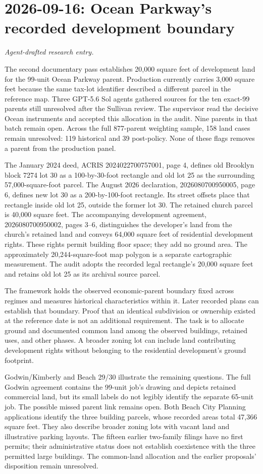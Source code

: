 \clearpage
\section*{2026-09-16: Ocean Parkway's recorded development boundary}
\textit{Agent-drafted research entry.}

The second documentary pass establishes 20,000 square feet of development land
for the 99-unit Ocean Parkway parent. Production currently carries 3,000 square
feet because the same tax-lot identifier described a different parcel in the
reference map. Three GPT-5.6 Sol agents gathered sources for the ten exact-99
parents still unresolved after the Sullivan review. The supervisor read the
decisive Ocean instruments and accepted this allocation in the audit. Nine
parents in that batch remain open. Across the full 877-parent weighting sample,
158 land cases remain unresolved: 119 historical and 39 post-policy. None of
these flags removes a parent from the production panel.

The January 2024 deed, ACRIS 2024022700757001, page 4, defines old Brooklyn
block 7274 lot 30 as a 100-by-30-foot rectangle and old lot 25 as the surrounding
57,000-square-foot parcel. The August 2026 declaration, 2026080700950005,
page 6, defines new lot 30 as a 200-by-100-foot rectangle. Its street offsets
place that rectangle inside old lot 25, outside the former lot 30. The retained
church parcel is 40,000 square feet. The accompanying development agreement,
2026080700950002, pages 3--6, distinguishes the developer's land from the
church's retained land and conveys 64,000 square feet of residential
development rights. These rights permit building floor space; they add no
ground area. The approximately 20,244-square-foot map polygon is a separate
cartographic measurement. The audit adopts the recorded legal rectangle's
20,000 square feet and retains old lot 25 as its archival source parcel.

The framework holds the observed economic-parent boundary fixed across
regimes and measures historical characteristics within it. Later recorded
plans can establish that boundary. Proof that an identical subdivision or
ownership existed at the reference date is not an additional requirement.
The task is to allocate ground and documented common land among the observed
buildings, retained uses, and other phases. A broader zoning lot can include
land contributing development rights without belonging to the residential
development's ground footprint.

Godwin/Kimberly and Beach 29/30 illustrate the remaining questions. The full
Godwin agreement contains the 99-unit job's drawing and depicts retained
commercial land, but its small labels do not legibly identify the separate
65-unit job. The possible missed parent link remains open. Both Beach City
Planning applications identify the three building parcels, whose recorded
areas total 47,366 square feet. They also describe broader zoning lots with
vacant land and illustrative parking layouts. The fifteen earlier two-family
filings have no first permits; their administrative status does not establish
coexistence with the three permitted large buildings. The common-land allocation
and the earlier proposals' disposition remain unresolved.


